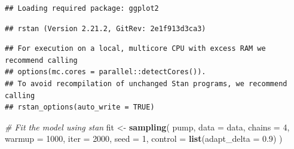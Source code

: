 \documentclass[
]{article}
\newenvironment{Shaded}{\begin{snugshade}}{\end{snugshade}}
\newcommand{\CommentTok}[1]{\textcolor[rgb]{0.56,0.35,0.01}{\textit{#1}}}
\newcommand{\DataTypeTok}[1]{\textcolor[rgb]{0.13,0.29,0.53}{#1}}
\newcommand{\DecValTok}[1]{\textcolor[rgb]{0.00,0.00,0.81}{#1}}
\newcommand{\FloatTok}[1]{\textcolor[rgb]{0.00,0.00,0.81}{#1}}
\newcommand{\KeywordTok}[1]{\textcolor[rgb]{0.13,0.29,0.53}{\textbf{#1}}}
\newcommand{\NormalTok}[1]{#1}
\newcommand{\StringTok}[1]{\textcolor[rgb]{0.31,0.60,0.02}{#1}}
\begin{document}
\begin{verbatim}
## Loading required package: ggplot2
\end{verbatim}

\begin{verbatim}
## rstan (Version 2.21.2, GitRev: 2e1f913d3ca3)
\end{verbatim}

\begin{verbatim}
## For execution on a local, multicore CPU with excess RAM we recommend calling
## options(mc.cores = parallel::detectCores()).
## To avoid recompilation of unchanged Stan programs, we recommend calling
## rstan_options(auto_write = TRUE)
\end{verbatim}

\begin{Shaded}
\begin{Highlighting}[]
\CommentTok{# Fit the model using stan}
\NormalTok{fit <-}\StringTok{ }\KeywordTok{sampling}\NormalTok{(}
\NormalTok{  pump,}
  \DataTypeTok{data =}\NormalTok{ data,}
  \DataTypeTok{chains =} \DecValTok{4}\NormalTok{,}
  \DataTypeTok{warmup =} \DecValTok{1000}\NormalTok{,}
  \DataTypeTok{iter =} \DecValTok{2000}\NormalTok{,}
  \DataTypeTok{seed =} \DecValTok{1}\NormalTok{,}
  \DataTypeTok{control =} \KeywordTok{list}\NormalTok{(}\DataTypeTok{adapt_delta =} \FloatTok{0.9}\NormalTok{)}
\NormalTok{)}
\end{Highlighting}
\end{Shaded}
\end{document}
